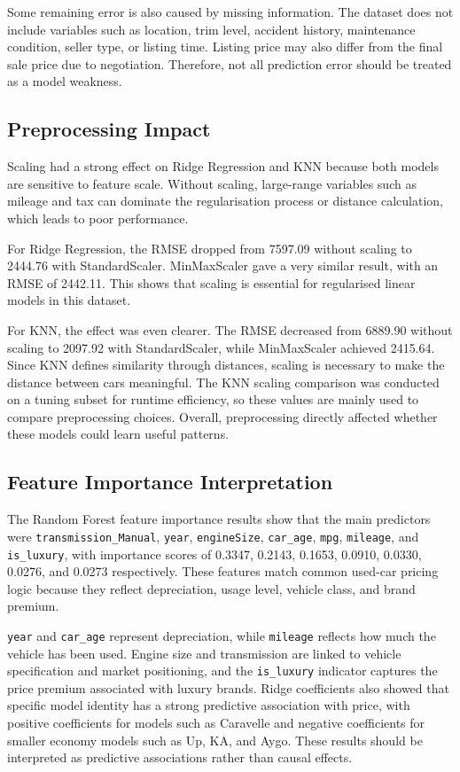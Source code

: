 Some remaining error is also caused by missing information.
The dataset does not include variables such as location, trim level, accident history, maintenance condition, seller type, or listing time.
Listing price may also differ from the final sale price due to negotiation.
Therefore, not all prediction error should be treated as a model weakness.

\subsection{Preprocessing Impact}

Scaling had a strong effect on Ridge Regression and KNN because both models are sensitive to feature scale.
Without scaling, large-range variables such as mileage and tax can dominate the regularisation process or distance calculation, which leads to poor performance.

For Ridge Regression, the RMSE dropped from 7597.09 without scaling to 2444.76 with StandardScaler.
MinMaxScaler gave a very similar result, with an RMSE of 2442.11.
This shows that scaling is essential for regularised linear models in this dataset.

For KNN, the effect was even clearer.
The RMSE decreased from 6889.90 without scaling to 2097.92 with StandardScaler, while MinMaxScaler achieved 2415.64.
Since KNN defines similarity through distances, scaling is necessary to make the distance between cars meaningful.
The KNN scaling comparison was conducted on a tuning subset for runtime efficiency, so these values are mainly used to compare preprocessing choices.
Overall, preprocessing directly affected whether these models could learn useful patterns.

\subsection{Feature Importance Interpretation}

The Random Forest feature importance results show that the main predictors were \texttt{transmission\_Manual}, \texttt{year}, \texttt{engineSize}, \texttt{car\_age}, \texttt{mpg}, \texttt{mileage}, and \texttt{is\_luxury}, with importance scores of 0.3347, 0.2143, 0.1653, 0.0910, 0.0330, 0.0276, and 0.0273 respectively.
These features match common used-car pricing logic because they reflect depreciation, usage level, vehicle class, and brand premium.

\texttt{year} and \texttt{car\_age} represent depreciation, while \texttt{mileage} reflects how much the vehicle has been used.
Engine size and transmission are linked to vehicle specification and market positioning, and the \texttt{is\_luxury} indicator captures the price premium associated with luxury brands.
Ridge coefficients also showed that specific model identity has a strong predictive association with price, with positive coefficients for models such as Caravelle and negative coefficients for smaller economy models such as Up, KA, and Aygo.
These results should be interpreted as predictive associations rather than causal effects.

